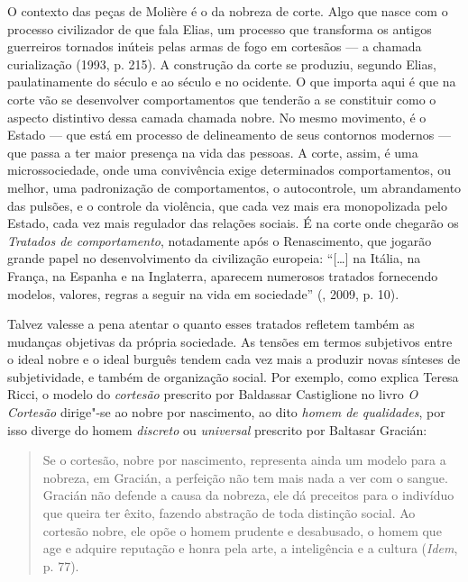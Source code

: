 O contexto das peças de Molière é o da nobreza de corte. Algo que nasce
com o processo civilizador de que fala Elias, um processo que transforma
os antigos guerreiros tornados inúteis pelas armas de fogo em cortesãos
--- a chamada curialização (1993, p. 215). A construção da corte se
produziu, segundo Elias, paulatinamente do século  e  ao século
 e  no ocidente. O que importa aqui é que na corte vão se
desenvolver comportamentos que tenderão a se constituir como o aspecto
distintivo dessa camada chamada nobre. No mesmo movimento, é o Estado ---
que está em processo de delineamento de seus contornos modernos --- que passa a ter maior
presença na vida das pessoas. A corte, assim, é uma microssociedade,
onde uma convivência exige determinados comportamentos, ou melhor, uma
padronização de comportamentos, o autocontrole, um abrandamento das
pulsões, e o controle da violência, que cada vez mais era monopolizada
pelo Estado, cada vez mais regulador das relações sociais. É na corte
onde chegarão os \emph{Tratados de comportamento}, notadamente após o
Renascimento, que jogarão grande papel no desenvolvimento da civilização
europeia: ``[\ldots{}] na Itália, na França, na Espanha e na
Inglaterra, aparecem numerosos tratados fornecendo modelos, valores,
regras a seguir na vida em sociedade'' (, 2009, p. 10).

Talvez valesse a pena atentar o quanto esses tratados refletem também as
mudanças objetivas da própria sociedade. As tensões em termos subjetivos
entre o ideal nobre e o ideal burguês tendem cada vez mais a produzir
novas sínteses de subjetividade, e também de organização social. Por
exemplo, como explica Teresa Ricci, o modelo do \emph{cortesão}
prescrito por Baldassar Castiglione no livro \emph{O Cortesão} dirige"-se
ao nobre por nascimento, ao dito \emph{homem de qualidades}, por isso
diverge do homem \emph{discreto} ou \emph{universal} prescrito por
Baltasar Gracián:

\begin{quote}
Se o cortesão, nobre por nascimento, representa ainda um modelo para a
nobreza, em Gracián, a perfeição não tem mais nada a ver com o sangue.
Gracián não defende a causa da nobreza, ele dá preceitos para o
indivíduo que queira ter êxito, fazendo abstração de toda distinção
social. Ao cortesão nobre, ele opõe o homem prudente e desabusado, o
homem que age e adquire reputação e honra pela arte, a inteligência e a
cultura (\emph{Idem}, p. 77).
\end{quote}

